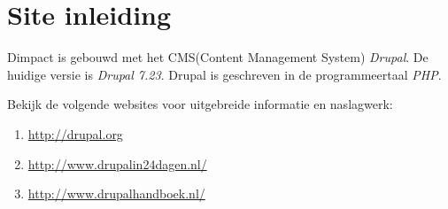 
\section{Site inleiding}\label{siteinleiding}
Dimpact is gebouwd met het CMS(Content Management System) \emph{Drupal}. De huidige versie is \emph{Drupal 7.23}.
Drupal is geschreven in de programmeertaal \emph{PHP}.

Bekijk de volgende websites voor uitgebreide informatie en naslagwerk:

\begin{enumerate}
\item \url{http://drupal.org}
\item \url{http://www.drupalin24dagen.nl/}
\item \url{http://www.drupalhandboek.nl/}
\end{enumerate}




